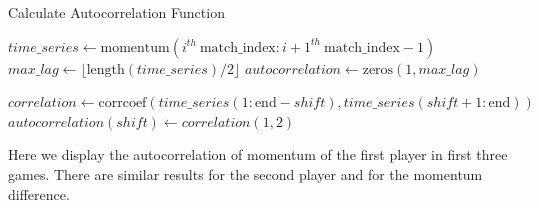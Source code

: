 \begin{algorithm}
    \caption{Calculate Autocorrelation Function}\label{alg:auto_corr}
    \begin{algorithmic}
            \State $time\_series \gets \text{momentum}(i^{th}\ \text{match\_index} : {i+1}^{th}\ \text{match\_index} - 1)$
            \State $max\_lag \gets \lfloor \text{length}(time\_series) / 2 \rfloor$ 
            \State $autocorrelation \gets \text{zeros}(1, max\_lag)$

                \State $correlation \gets \text{corrcoef}(time\_series(1 : \text{end} - shift), time\_series(shift + 1 : \text{end}))$
                \State $autocorrelation(shift) \gets correlation(1, 2)$
            \EndFor

        \EndFor
    \end{algorithmic}
\end{algorithm}

Here we display the autocorrelation of momentum of the first player in first three games.
There are similar results for the second player and for the momentum difference.

